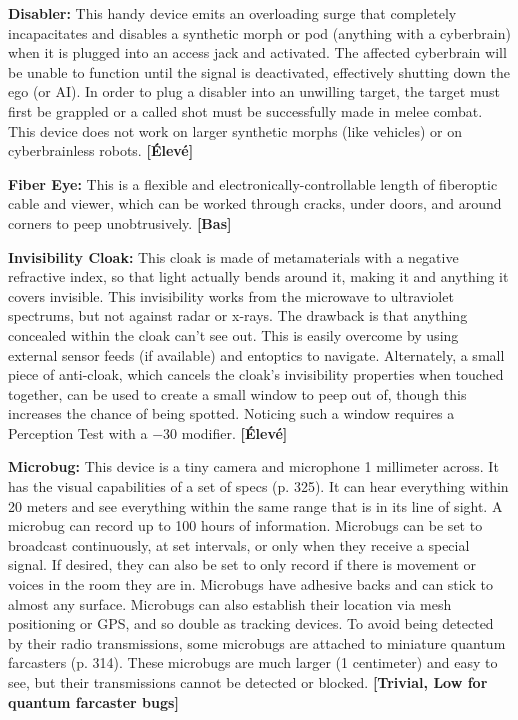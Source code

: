 {{\textbf{Disabler:} This handy device emits an overloading surge that completely incapacitates and disables a synthetic morph or pod (anything with a cyberbrain) when it is plugged into an access jack and activated. The affected cyberbrain will be unable to function until the signal is deactivated, effectively shutting down the ego (or AI). In order to plug a disabler into an unwilling target, the target must first be grappled or a called shot must be successfully made in melee combat. This device does not work on larger synthetic morphs (like vehicles) or on cyberbrainless robots. \textbf{[Élevé]} 

\textbf{Fiber Eye:} This is a flexible and electronically-controllable length of fiberoptic cable and viewer, which can be worked through cracks, under doors, and around corners to peep unobtrusively. \textbf{[Bas]} 

\textbf{Invisibility Cloak:} This cloak is made of metamaterials with a negative refractive index, so that light actually bends around it, making it and anything it covers invisible. This invisibility works from the microwave to ultraviolet spectrums, but not against radar or x-rays. The drawback is that anything concealed within the cloak can’t see out. This is easily overcome by using external sensor feeds (if available) and entoptics to navigate. Alternately, a small piece of anti-cloak, which cancels the cloak’s invisibility properties when touched together, can be used to create a small window to peep out of, though this increases the chance of being spotted. Noticing such a window requires a Perception Test with a $-$30 modifier. \textbf{[Élevé]} 

\textbf{Microbug:} This device is a tiny camera and microphone 1 millimeter across. It has the visual capabilities of a set of specs (p. 325). It can hear everything within 20 meters and see everything within the same range that is in its line of sight. A microbug can record up to 100 hours of information. Microbugs can be set to broadcast continuously, at set intervals, or only when they receive a special signal. If desired, they can also be set to only record if there is movement or voices in the room they are in. Microbugs have adhesive backs and can stick to almost any surface. Microbugs can also establish their location via mesh positioning or GPS, and so double as tracking devices. To avoid being detected by their radio transmissions, some microbugs are attached to miniature quantum farcasters (p. 314). These microbugs are much larger (1 centimeter) and easy to see, but their transmissions cannot be detected or blocked. \textbf{[Trivial, Low for quantum farcaster bugs]} 

}}
